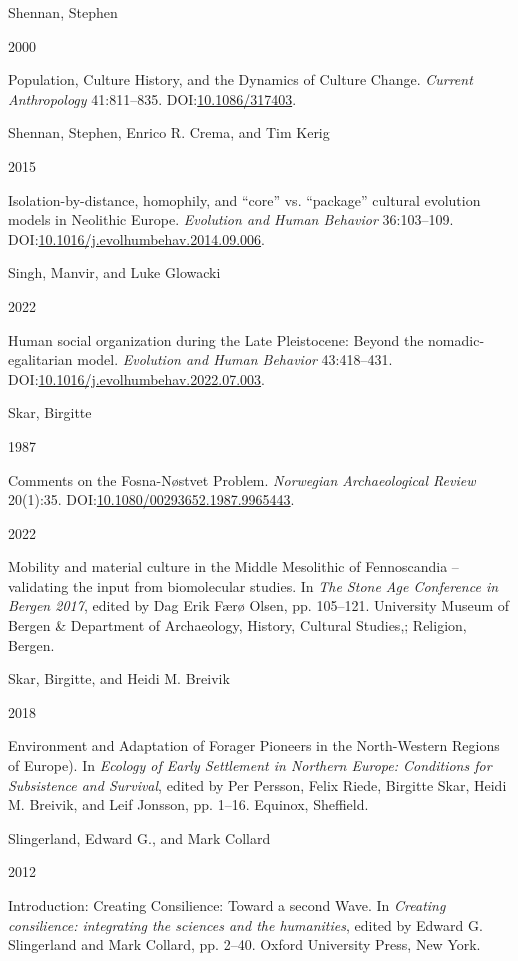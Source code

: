\documentclass[
  a4paper,
  oneside]{uiophdthesis}
\newlength{\cslhangindent}
\newlength{\csllabelwidth}
\newlength{\cslentryspacingunit} %
\newenvironment{CSLReferences}[2] %
 {%
  \setlength{\parindent}{0pt}
  \ifodd #1
  \let\oldpar\par
  \def\par{\hangindent=\cslhangindent\oldpar}
  \fi
  \setlength{\parskip}{#2\cslentryspacingunit}
 }%
 {}
\newcommand{\CSLBlock}[1]{#1\hfill\break}
\newcommand{\CSLLeftMargin}[1]{\parbox[t]{\csllabelwidth}{#1}}
\newcommand{\CSLRightInline}[1]{\parbox[t]{\linewidth - \csllabelwidth}{#1}\break}
\begin{document}
\begin{CSLReferences}{0}{0}
\leavevmode{}%
\CSLBlock{Shennan, Stephen}
\CSLLeftMargin{ 2000}
\CSLRightInline{Population, Culture History, and the Dynamics of Culture Change. \emph{Current Anthropology} 41:811--835. DOI:\href{https://doi.org/10.1086/317403}{10.1086/317403}.}

\leavevmode{}%
\CSLBlock{Shennan, Stephen, Enrico R. Crema, and Tim Kerig}
\CSLLeftMargin{ 2015}
\CSLRightInline{{Isolation-by-distance, homophily, and {``core''} vs. {``package''} cultural evolution models in Neolithic Europe}. \emph{Evolution and Human Behavior} 36:103--109. DOI:\href{https://doi.org/10.1016/j.evolhumbehav.2014.09.006}{10.1016/j.evolhumbehav.2014.09.006}.}

\leavevmode{}%
\CSLBlock{Singh, Manvir, and Luke Glowacki}
\CSLLeftMargin{ 2022}
\CSLRightInline{{Human social organization during the Late Pleistocene: Beyond the nomadic-egalitarian model}. \emph{Evolution and Human Behavior} 43:418--431. DOI:\href{https://doi.org/10.1016/j.evolhumbehav.2022.07.003}{10.1016/j.evolhumbehav.2022.07.003}.}

\leavevmode{}%
\CSLBlock{Skar, Birgitte}
\CSLLeftMargin{ 1987}
\CSLRightInline{{Comments on the Fosna-Nøstvet Problem}. \emph{Norwegian Archaeological Review} 20(1):35. DOI:\href{https://doi.org/10.1080/00293652.1987.9965443}{10.1080/00293652.1987.9965443}.}

\leavevmode{}%
\CSLLeftMargin{ 2022 }
\CSLRightInline{{Mobility and material culture in the Middle Mesolithic of Fennoscandia -- validating the input from biomolecular studies}. In \emph{{The Stone Age Conference in Bergen 2017}}, edited by Dag Erik Færø Olsen, pp. 105--121. University Museum of Bergen \& Department of Archaeology, History, Cultural Studies,; Religion, Bergen.}

\leavevmode{}%
\CSLBlock{Skar, Birgitte, and Heidi M. Breivik}
\CSLLeftMargin{ 2018}
\CSLRightInline{{Environment and Adaptation of Forager Pioneers in the North-Western Regions of Europe)}. In \emph{{Ecology of Early Settlement in Northern Europe: Conditions for Subsistence and Survival}}, edited by Per Persson, Felix Riede, Birgitte Skar, Heidi M. Breivik, and Leif Jonsson, pp. 1--16. Equinox, Sheffield.}

\leavevmode{}%
\CSLBlock{Slingerland, Edward G., and Mark Collard}
\CSLLeftMargin{ 2012}
\CSLRightInline{{Introduction: Creating Consilience: Toward a second Wave}. In \emph{{Creating consilience: integrating the sciences and the humanities}}, edited by Edward G. Slingerland and Mark Collard, pp. 2--40. Oxford University Press, New York.}


\end{CSLReferences}
\end{document}
